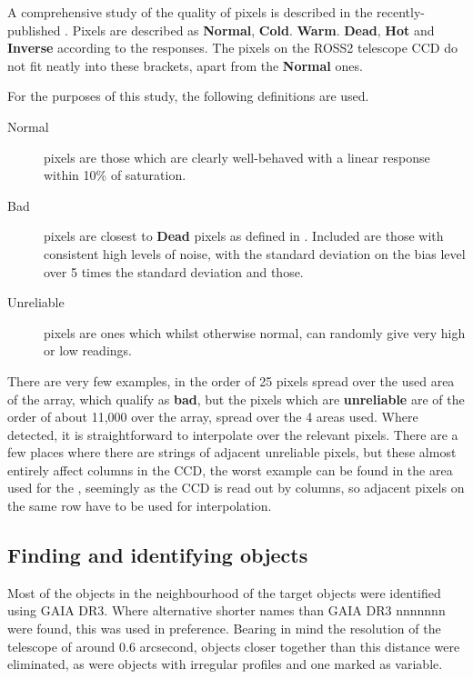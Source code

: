 A comprehensive study of the quality of pixels is described in the
recently-published \citet{maslennikova20}. Pixels are described as
\textbf{Normal}, \textbf{Cold}. \textbf{Warm}. \textbf{Dead}, \textbf{Hot} and
\textbf{Inverse} according to the responses. The pixels on the ROSS2 telescope
CCD do not fit neatly into these brackets, apart from the \textbf{Normal} ones.

For the purposes of this study, the following definitions are used.

\begin{description}
\item[Normal] pixels are those which are clearly well-behaved with a linear
response within 10\% of saturation.
\item[Bad] pixels are closest to \textbf{Dead} pixels as defined in 
\citet{maslennikova20}. Included are those with consistent high levels of noise,
with the standard deviation on the bias level over 5 times the standard
deviation and those.
\item[Unreliable] pixels are ones which whilst otherwise normal, can randomly
give very high or low readings.
\end{description}

There are very few examples, in the order of 25 pixels spread over the used area
of the array, which qualify as \textbf{bad}, but the pixels which are
\textbf{unreliable} are of the order of about 11,000 over the array, spread over
the 4 areas used. Where detected, it is straightforward to interpolate over the
relevant pixels. There are a few places where there are strings of
adjacent unreliable pixels, but these almost entirely affect columns in the CCD,
the worst example can be found in the area used for the \gfilter, seemingly as
the CCD is read out by columns, so adjacent pixels on the same row have to be
used for interpolation.

\subsection{Finding and identifying objects}
\protect\label{section:findingidentify}

Most of the objects in the neighbourhood of the target {\rdwarf} objects were
identified using GAIA DR3. Where alternative shorter names than GAIA DR3 nnnnnnn
were found, this was used in preference. Bearing in mind the resolution of the
{\rem} telescope of around 0.6 arcsecond, objects closer together than this
distance were eliminated, as were objects with irregular profiles and one marked
as variable.

